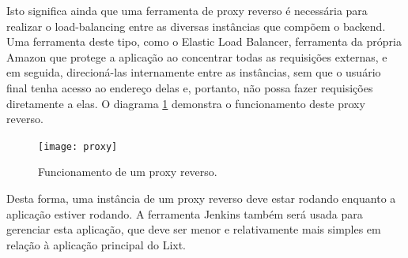 Isto significa ainda que uma ferramenta de \gls{proxy} reverso é
necessária para realizar o \gls{load-balancing} entre as diversas
instâncias que compõem o \gls{backend}. Uma ferramenta deste tipo, como
o Elastic Load Balancer, ferramenta da própria Amazon que protege a
aplicação ao concentrar todas as requisições externas, e em seguida,
direcioná-las internamente entre as instâncias, sem que o usuário
final tenha acesso ao endereço delas e, portanto, não possa fazer
requisições diretamente a elas.  O diagrama \ref{fig:proxy} demonstra o
funcionamento deste proxy reverso.

\begin{figure}[!htb]
  \centering
  \caption{Funcionamento de um proxy reverso.}
  \label{fig:proxy}
  \texttt{[image: proxy]}
\end{figure}

Desta forma, uma instância de um \gls{proxy} reverso deve estar rodando
enquanto a aplicação estiver rodando. A ferramenta Jenkins também será
usada para gerenciar esta aplicação, que deve ser menor e
relativamente mais simples em relação à aplicação principal do Lixt.

